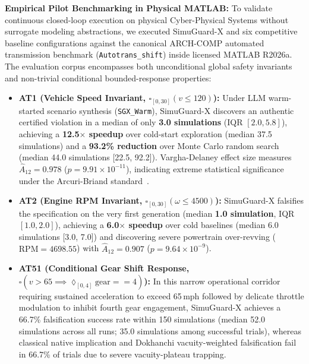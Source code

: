 \documentclass[journal]{IEEEtran}
\begin{document}
\noindent\textbf{Empirical Pilot Benchmarking in Physical MATLAB:}
To validate continuous closed-loop execution on physical Cyber-Physical Systems without surrogate modeling abstractions, we executed SimuGuard-X and six competitive baseline configurations against the canonical ARCH-COMP automated transmission benchmark (\texttt{Autotrans\_shift}) inside licensed MATLAB R2026a. The evaluation corpus encompasses both unconditional global safety invariants and non-trivial conditional bounded-response properties:
\begin{itemize}
    \item \textbf{AT1 (Vehicle Speed Invariant, $\square_{[0,30]} (v \le 120)$):} Under LLM warm-started scenario synthesis (\texttt{SGX\_Warm}), SimuGuard-X discovers an authentic certified violation in a median of only \textbf{3.0 simulations} (IQR $[2.0, 5.8]$), achieving a \textbf{12.5$\times$ speedup} over cold-start exploration (median 37.5 simulations) and a \textbf{93.2\% reduction} over Monte Carlo random search (median 44.0 simulations [22.5, 92.2]). Vargha-Delaney effect size measures $\hat{A}_{12} = 0.978$ ($p = 9.91 \times 10^{-11}$), indicating extreme statistical significance under the Arcuri-Briand standard~\cite{arcuri2011practical}.
    \item \textbf{AT2 (Engine RPM Invariant, $\square_{[0,30]} (\omega \le 4500)$):} SimuGuard-X falsifies the specification on the very first generation (median \textbf{1.0 simulation}, IQR $[1.0, 2.0]$), achieving a \textbf{6.0$\times$ speedup} over cold baselines (median 6.0 simulations [3.0, 7.0]) and discovering severe powertrain over-revving ($\text{RPM} = 4698.55$) with $\hat{A}_{12} = 0.907$ ($p = 9.64 \times 10^{-9}$).
    \item \textbf{AT51 (Conditional Gear Shift Response, $\square(v > 65 \implies \lozenge_{[0, 4]} \text{gear} == 4)$):} In this narrow operational corridor requiring sustained acceleration to exceed 65\,mph followed by delicate throttle modulation to inhibit fourth gear engagement, SimuGuard-X achieves a 66.7\% falsification success rate within 150 simulations (median 52.0 simulations across all runs; 35.0 simulations among successful trials), whereas classical native implication and Dokhanchi vacuity-weighted falsification fail in 66.7\% of trials due to severe vacuity-plateau trapping.
\end{itemize}
\end{document}
